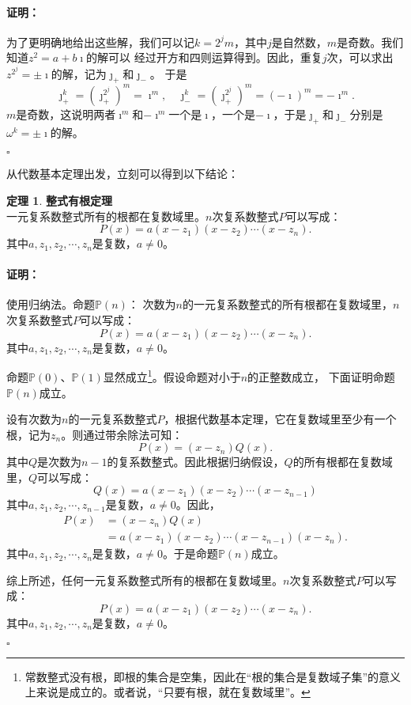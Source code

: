 \documentclass[12pt,UTF8]{ctexbook}
\theoremstyle{definition}
\newtheorem{tm}{定理}[section]
\theoremstyle{plain}
\renewenvironment{proof}{\paragraph{\textbf{证明：}}}{\hfill$\square$}
\begin{document}
\begin{appendix}
\begin{proof}
    为了更明确地给出这些解，我们可以记$k = 2^j m$，其中$j$是自然数，$m$是奇数。我们知道$z^2 = a + b\imath$的解可以
    经过开方和四则运算得到。因此，重复$j$次，可以求出$z^{2^j} = \pm \imath$的解，记为$\jmath_+$和$\jmath_-$。
    于是
    $$\jmath_+^k = \left(\jmath_+^{2^j}\right)^m = \imath^m, \quad \jmath_-^k = \left(\jmath_+^{2^j}\right)^m = (-\imath)^m = -\imath^m.$$
    $m$是奇数，这说明两者$\imath^m$和$-\imath^m$一个是$\imath$，一个是$-\imath$，于是$\jmath_+$和$\jmath_-$分别是$\omega^k = \pm \imath$的解。

\end{proof}

从代数基本定理出发，立刻可以得到以下结论：

\begin{tm}{\textbf{整式有根定理}}
    \mbox{} \\
    \indent 一元复系数整式所有的根都在复数域里。$n$次复系数整式$P$可以写成：
    $$ P(x) = a(x - z_1)(x - z_2)\cdots(x - z_n).$$
    其中$a, z_1, z_2,\cdots, z_n$是复数，$a\neq 0$。   
\end{tm}

\begin{proof}
    使用归纳法。命题$\mathbb{P}(n)$：
    次数为$n$的一元复系数整式的所有根都在复数域里，$n$次复系数整式$P$可以写成：
    $$ P(x) = a(x - z_1)(x - z_2)\cdots(x - z_n).$$
    其中$a, z_1, z_2,\cdots, z_n$是复数，$a\neq 0$。 

    命题$\mathbb{P}(0)$、$\mathbb{P}(1)$显然成立\footnote{常数整式没有根，即根的集合是空集，因此在“根的集合是复数域子集”的意义上来说是成立的。或者说，“只要有根，就在复数域里”。}。假设命题对小于$n$的正整数成立，
    下面证明命题$\mathbb{P}(n)$成立。

    设有次数为$n$的一元复系数整式$P$，根据代数基本定理，它在复数域里至少有一个根，记为$z_n$。则通过带余除法可知：
    $$ P(x) = (x - z_n)Q(x).$$
    其中$Q$是次数为$n-1$的复系数整式。因此根据归纳假设，$Q$的所有根都在复数域里，$Q$可以写成：
    $$ Q(x) = a(x - z_1)(x - z_2)\cdots(x - z_{n-1})$$
    其中$a, z_1, z_2,\cdots, z_{n-1}$是复数，$a\neq 0$。因此，
    \begin{align*} 
        P(x) &= (x - z_n)Q(x) \\
        &= a(x - z_1)(x - z_2)\cdots(x - z_{n-1})(x - z_n).
    \end{align*}
    其中$a, z_1, z_2,\cdots, z_n$是复数，$a\neq 0$。于是命题$\mathbb{P}(n)$成立。

    综上所述，任何一元复系数整式所有的根都在复数域里。$n$次复系数整式$P$可以写成：
    $$ P(x) = a(x - z_1)(x - z_2)\cdots(x - z_n).$$
    其中$a, z_1, z_2,\cdots, z_n$是复数，$a\neq 0$。 


\end{proof}
\end{appendix}
\end{document}
